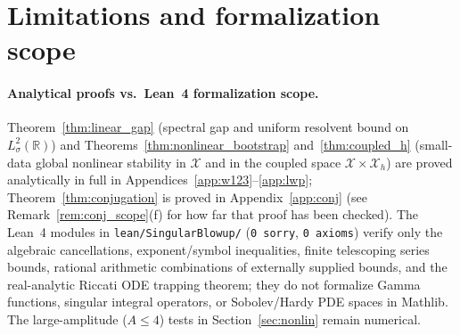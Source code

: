 \documentclass[11pt,a4paper]{article}
\begin{document}
\section{Limitations and formalization scope}

\paragraph{Analytical proofs vs.\ Lean~4 formalization scope.}
Theorem~\ref{thm:linear_gap} (spectral gap and uniform resolvent bound on $L^2_\sigma(\mathbb{R})$)
and Theorems~\ref{thm:nonlinear_bootstrap} and~\ref{thm:coupled_h} (small-data global nonlinear
stability in $\mathcal{X}$ and in the coupled space $\mathcal{X}\times\mathcal{X}_h$) are proved analytically in
full in Appendices~\ref{app:w123}--\ref{app:lwp}; Theorem~\ref{thm:conjugation} is proved in Appendix~\ref{app:conj}
(see Remark~\ref{rem:conj_scope}(f) for how far that proof has been checked).
The Lean~4 modules in \texttt{lean/SingularBlowup/} (\texttt{0~sorry}, \texttt{0~axioms})
verify only the algebraic cancellations, exponent/symbol inequalities, finite telescoping series
bounds, rational arithmetic combinations of externally supplied bounds, and the real-analytic
Riccati ODE trapping theorem; they do not formalize Gamma functions, singular integral operators,
or Sobolev/Hardy PDE spaces in Mathlib.  The large-amplitude ($A\le 4$) tests in
Section~\ref{sec:nonlin} remain numerical.
\end{document}
